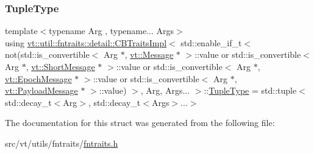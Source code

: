 \subsubsection{\texorpdfstring{Tuple\+Type}{TupleType}}
{\footnotesize\ttfamily template$<$typename Arg , typename... Args$>$ \\
using \hyperlink{structvt_1_1util_1_1fntraits_1_1detail_1_1_c_b_traits_impl}{vt\+::util\+::fntraits\+::detail\+::\+C\+B\+Traits\+Impl}$<$ std\+::enable\+\_\+if\+\_\+t$<$ not(std\+::is\+\_\+convertible$<$ Arg $\ast$, \hyperlink{namespacevt_a3a3ddfef40b4c90915fa43cdd5f129ea}{vt\+::\+Message} $\ast$ $>$\+::value or std\+::is\+\_\+convertible$<$ Arg $\ast$, \hyperlink{namespacevt_a1125ac1da6c0bbf141e0ea0739d7602d}{vt\+::\+Short\+Message} $\ast$ $>$\+::value or std\+::is\+\_\+convertible$<$ Arg $\ast$, \hyperlink{namespacevt_ad67368ffae52d7325002586b41bb150e}{vt\+::\+Epoch\+Message} $\ast$ $>$\+::value or std\+::is\+\_\+convertible$<$ Arg $\ast$, \hyperlink{namespacevt_a89a92229c5622b855c02c549f83a1a68}{vt\+::\+Payload\+Message} $\ast$ $>$\+::value) $>$, Arg, Args... $>$\+::\hyperlink{structvt_1_1util_1_1fntraits_1_1detail_1_1_c_b_traits_impl_3_01std_1_1enable__if__t_3_01not_07st51a32586efc3bbebdea14e54779d89f5_a96ef7c69232c423fe8842784c0f14765}{Tuple\+Type} =  std\+::tuple$<$std\+::decay\+\_\+t$<$Arg$>$, std\+::decay\+\_\+t$<$Args$>$...$>$}



The documentation for this struct was generated from the following file\+:\begin{DoxyCompactItemize}
\item 
src/vt/utils/fntraits/\hyperlink{fntraits_8h}{fntraits.\+h}\end{DoxyCompactItemize}
